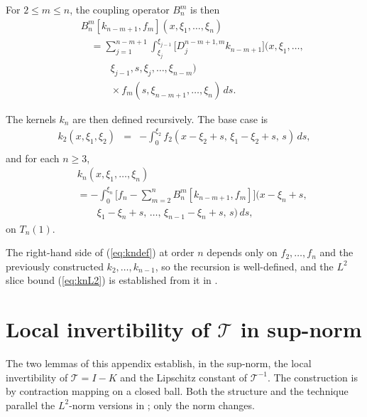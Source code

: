 \documentclass[10pt,a4paper]{amsart}
\newcommand{\Tcal}{\mathcal{T}}
\newcommand{\Ltwo}{L^2}
\begin{document}
For $2 \le m \le n$, the coupling operator $B_n^m$ is then
\begin{eqnarray}
&& B_n^m[k_{n-m+1}, f_m](x, \xi_1, \ldots, \xi_n) \nonumber \\
&& \quad = \sum_{j=1}^{n-m+1} \int_{\xi_j}^{\xi_{j-1}} \bigl[D_j^{n-m+1,m} k_{n-m+1}\bigr]\bigl(x, \xi_1, \ldots, \nonumber \\
&& \quad\quad\quad \xi_{j-1}, s, \xi_j, \ldots, \xi_{n-m}\bigr) \nonumber \\
&& \quad\quad\quad \times f_m(s, \xi_{n-m+1}, \ldots, \xi_n)\, ds.
\label{eq:Bdef}
\end{eqnarray}

The kernels $k_n$ are then defined recursively. The base case is
\begin{eqnarray}
k_2(x, \xi_1, \xi_2) &=& -\int_0^{\xi_2} f_2(x - \xi_2 + s,\, \xi_1 - \xi_2 + s,\, s)\, ds, \nonumber \\
&&
\label{eq:k2def}
\end{eqnarray}
and for each $n \ge 3$,
\begin{eqnarray}
&& k_n(x, \xi_1, \ldots, \xi_n) \nonumber \\
&& = -\int_0^{\xi_n} \biggl[f_n - \sum_{m=2}^{n} B_n^m[k_{n-m+1}, f_m]\biggr]\bigl(x - \xi_n + s, \nonumber \\
&& \quad\quad \xi_1 - \xi_n + s,\, \ldots,\, \xi_{n-1} - \xi_n + s,\, s\bigr)\, ds,
\label{eq:kndef}
\end{eqnarray}
on $T_n(1)$.

The right-hand side of (\ref{eq:kndef}) at order $n$ depends only on $f_2, \ldots, f_n$ and the previously constructed $k_2, \ldots, k_{n-1}$, so the recursion is well-defined, and the $\Ltwo$ slice bound (\ref{eq:knL2}) is established from it in \cite{krstic2026feedbacklinearizationhyperbolicpdes}.

\section{Local invertibility of $\Tcal$ in sup-norm}\label{app:Tinv}

The two lemmas of this appendix establish, in the sup-norm, the local invertibility of $\Tcal = I - K$ and the Lipschitz constant of $\Tcal^{-1}$. The construction is by contraction mapping on a closed ball. Both the structure and the technique parallel the $\Ltwo$-norm versions in \cite{krstic2026feedbacklinearizationhyperbolicpdes}; only the norm changes.
\end{document}

